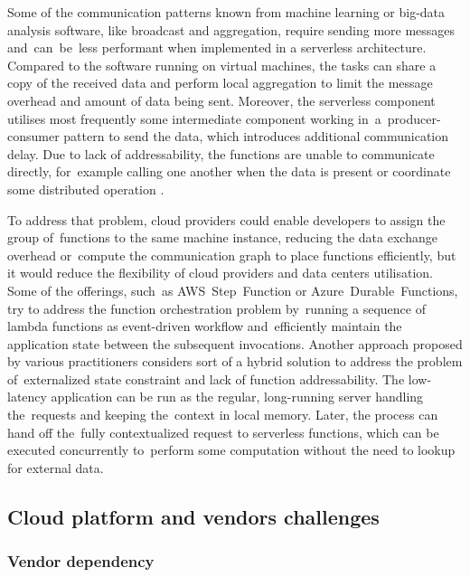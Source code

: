 Some of the communication patterns known from machine learning or big-data analysis software, like broadcast and aggregation, require sending more messages and~can~be~less performant when implemented in a serverless architecture. Compared to the software running on virtual machines, the tasks can share a copy of the received data and perform local aggregation to limit the message overhead and amount of data being sent. Moreover, the serverless component utilises most frequently some intermediate component working in~a~producer-consumer pattern to send the data, which introduces additional communication delay. Due to lack of addressability, the functions are unable to communicate directly, for~example calling one another when the data is present or coordinate some distributed operation \cite{BerkeleyServerless}.

To address that problem, cloud providers could enable developers to assign the group of~functions to the same machine instance, reducing the data exchange overhead or~compute the communication graph to place functions efficiently, but it would reduce the flexibility of cloud providers and data centers utilisation. Some of the offerings, such~as AWS~Step~Function or Azure~Durable~Functions, try to address the function orchestration problem by~running a sequence of lambda functions as event-driven workflow and~efficiently maintain the application state between the subsequent invocations.
Another approach proposed by various practitioners considers sort of a hybrid solution to address the problem of~externalized state constraint and lack of function addressability. The low-latency application can be run as the regular, long-running server handling the~requests and keeping the~context in local memory. Later, the process can hand off the~fully contextualized request to serverless functions, which can be executed concurrently to~perform some computation without the need to lookup for external data.

\subsection{Cloud platform and vendors challenges} \label{chapter:serverless-cloud-platform-and-vendor-challenges}

\subsubsection{Vendor dependency} \label{chapter:serverless-vendor-dependence}

